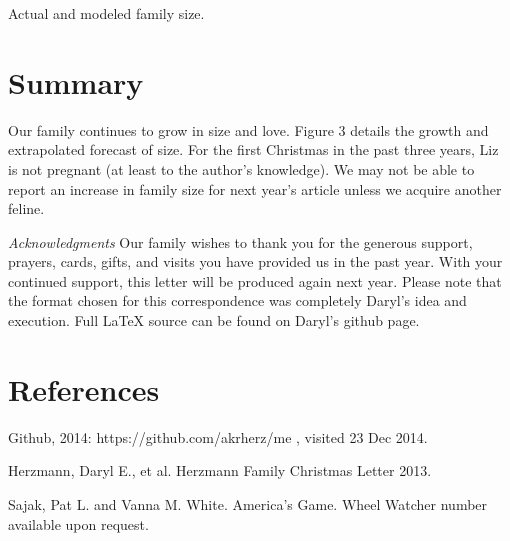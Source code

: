 \documentclass{article}
\makeatletter
\def\refer{\par\noindent\hangindent\parindent\hangafter1}
\newenvironment{figurehere}
  {\def\@captype{figure}}
  {}
\makeatother
\begin{document}
\begin{multicols}{2}
\begin{figurehere}
 \centering   
 \caption{Actual and modeled family size.}
\end{figurehere}

\section{Summary}

Our family continues to grow in size and love. Figure 3 details the growth and
extrapolated forecast of size.  For the first Christmas in
the past three years, Liz is not pregnant (at least to the author's knowledge).  
We may not be able to report
an increase in family size for next year's article unless we acquire another
feline.

\bigskip
  \emph{Acknowledgments} Our family wishes to thank you for the generous 
support, prayers, cards, gifts, and visits you have provided us in the past
year. With your continued support, this letter will be produced again
next year. Please note that the format chosen for this correspondence was
completely Daryl's idea and execution. Full \LaTeX\xspace source can be found on 
Daryl's github page.

\section{References}

\refer Github, 2014: https://github.com/akrherz/me , visited 23 Dec 2014.
\refer Herzmann, Daryl E., et al. Herzmann Family Christmas Letter 2013. 
\refer Sajak, Pat L. and Vanna M. White. America's Game. Wheel Watcher number 
available upon request. 

\end{multicols}
\end{document}
